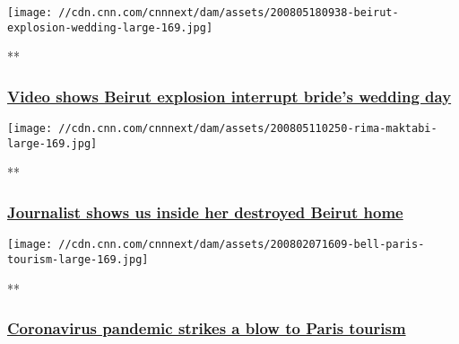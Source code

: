 \href{/videos/world/2020/08/05/beirut-explosion-wedding-video-zw-orig.cnn/video/playlists/around-the-world/}{}

\texttt{[image: //cdn.cnn.com/cnnnext/dam/assets/200805180938-beirut-explosion-wedding-large-169.jpg]}

**

\hypertarget{video-shows-beirut-explosion-interrupt-brides-wedding-day}{%
\subsubsection{\texorpdfstring{\href{/videos/world/2020/08/05/beirut-explosion-wedding-video-zw-orig.cnn/video/playlists/around-the-world/}{Video
shows Beirut explosion interrupt bride's wedding
day}}{Video shows Beirut explosion interrupt bride's wedding day}}\label{video-shows-beirut-explosion-interrupt-brides-wedding-day}}

\href{/videos/world/2020/08/05/rima-maktabi-journalist-home-destroyed-beirut-explosion-ctw-vpx.cnn/video/playlists/around-the-world/}{}

\texttt{[image: //cdn.cnn.com/cnnnext/dam/assets/200805110250-rima-maktabi-large-169.jpg]}

**

\hypertarget{journalist-shows-us-inside-her-destroyed-beirut-home}{%
\subsubsection{\texorpdfstring{\href{/videos/world/2020/08/05/rima-maktabi-journalist-home-destroyed-beirut-explosion-ctw-vpx.cnn/video/playlists/around-the-world/}{Journalist
shows us inside her destroyed Beirut
home}}{Journalist shows us inside her destroyed Beirut home}}\label{journalist-shows-us-inside-her-destroyed-beirut-home}}

\href{/videos/travel/2020/08/02/paris-france-tourism-coronavirus-bell-pkg-vpx.cnn/video/playlists/around-the-world/}{}

\texttt{[image: //cdn.cnn.com/cnnnext/dam/assets/200802071609-bell-paris-tourism-large-169.jpg]}

**

\hypertarget{coronavirus-pandemic-strikes-a-blow-to-paris-tourism}{%
\subsubsection{\texorpdfstring{\href{/videos/travel/2020/08/02/paris-france-tourism-coronavirus-bell-pkg-vpx.cnn/video/playlists/around-the-world/}{Coronavirus
pandemic strikes a blow to Paris
tourism}}{Coronavirus pandemic strikes a blow to Paris tourism}}\label{coronavirus-pandemic-strikes-a-blow-to-paris-tourism}}

